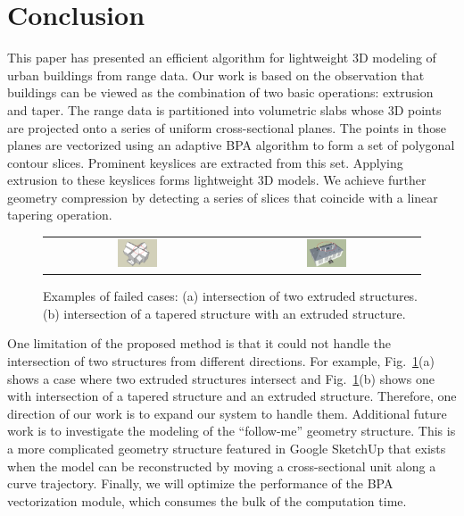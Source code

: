 \documentclass[10pt,journal,cspaper,compsoc]{IEEEtran}
\newcommand{\Figa}[1]{Fig.~\ref{fig:#1}(a)}
\newcommand{\Figb}[1]{Fig.~\ref{fig:#1}(b)}
\begin{document}
\section{Conclusion}

This paper has presented an efficient algorithm for lightweight 3D modeling
of urban buildings from range data.
Our work is based on the observation that buildings can be viewed as the
combination of two basic operations: extrusion and taper.
The range data is partitioned into volumetric slabs whose 3D points are
projected onto a series of uniform cross-sectional planes.
The points in those planes are vectorized using an adaptive BPA algorithm
to form a set of polygonal contour slices.
Prominent keyslices are extracted from this set.
Applying extrusion to these keyslices forms lightweight 3D models.
We achieve further geometry compression by detecting a series of
slices that coincide with a linear tapering operation.

\begin{figure} [htbp]
\begin{center}
\begin{tabular}{cc}
\includegraphics[width=0.22\textwidth]{limitation_1.png} &
\includegraphics[width=0.22\textwidth]{limitation_2.png}
\end{tabular}
\end{center}
\caption{Examples of failed cases:
      (a) intersection of two extruded structures.
      (b) intersection of a tapered structure with an extruded structure.}
\label{fig:ER_Lmt}
\end{figure}

One limitation of the proposed method is that 
it could not handle the intersection of two structures from different directions. 
For example, \Figa{ER_Lmt} shows a case where two extruded structures 
intersect and \Figb{ER_Lmt} shows one with intersection 
of a tapered structure and an extruded structure. 
Therefore, one direction of our work is to expand our system to handle them.
Additional future work is to investigate the modeling of the ``follow-me''
geometry structure.
This is a more complicated geometry structure featured in Google SketchUp
that exists when the model can be reconstructed by moving a cross-sectional
unit along a curve trajectory.
Finally, we will optimize the performance of the BPA vectorization module,
which consumes the bulk of the computation time.
\end{document}
